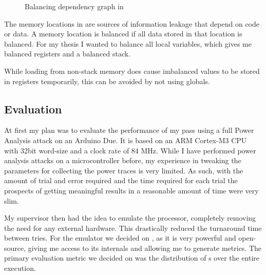 \begin{figure}[h]
  \caption{Balancing dependency graph in \llvm{}}
  \label{fig:balancing}
\end{figure}

The memory locations in  are sources of information leakage that depend on code or data.
A memory location is balanced if all data stored in that location is balanced.
For my thesis I wanted to balance all local variables, which gives me balanced registers and a balanced stack.

While loading from non-stack memory does cause imbalanced values to be stored in registers temporarily, this can be avoided by not using globals.

\subsection{Evaluation}
At first my plan was to evaluate the performance of my pass using a full Power Analysis attack on an Arduino Due\cite{arduino}.
It is based on an ARM Cortex-M3 CPU with 32bit word-size and a clock rate of 84 MHz.
While I have performed power analysis attacks on a microcontroller before, my experience in tweaking the parameters for collecting the power traces is very limited.
As such, with the amount of trial and error required and the time required for each trial the prospects of getting meaningful results in a reasonable amount of time were very slim.

My supervisor then had the idea to emulate the processor, completely removing the need for any external hardware.
This drastically reduced the turnaround time between tries.
For the emulator we decided on \qemu{}, as it is very powerful and open-source, giving me access to its internals and allowing me to generate metrics.
The primary evaluation metric we decided on was the distribution of \hammingw{}s over the entire execution.
